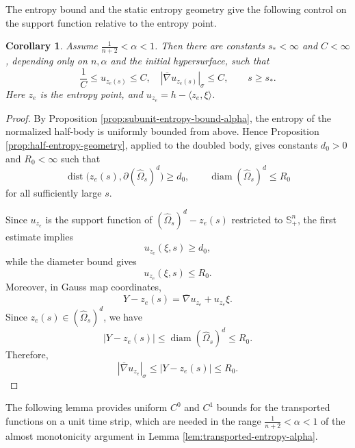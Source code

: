\documentclass[11pt, reqno]{amsart}
\newtheorem{corollary}[theorem]{Corollary}
\theoremstyle{remark}
\theoremstyle{definition}
\numberwithin{equation}{section}
\DeclareMathOperator{\diam}{diam}
\DeclareMathOperator{\dist}{dist}
\begin{document}
The entropy bound and the static entropy geometry give the following control on the support function relative to the entropy point.

\begin{corollary}
	\label{cor-bounded}
	Assume $\frac{1}{n+2} < \alpha <1$.  Then there are constants $s_*<\infty$ and $C<\infty$, depending only on
	$n,\alpha$ and the initial hypersurface, such that
	\begin{equation*}
		\frac{1}{C} \leq u_{z_e(s)}\leq C , \quad |\overline{\nabla}u_{z_e(s)}|_{\sigma} \leq C,
		\qquad s\ge s_*.
	\end{equation*}
    Here $z_e$ is the entropy point, and $u_{z_e}=h-\langle z_e,\xi \rangle$.
\end{corollary}

\begin{proof}
By Proposition \ref{prop:subunit-entropy-bound-alpha}, the entropy of the normalized half-body is
uniformly bounded from above. Hence Proposition \ref{prop:half-entropy-geometry}, applied to
the doubled body, gives constants $d_0>0$ and $R_0<\infty$ such
that
\begin{equation*}
    \dist\bigl(z_e(s),\partial(\widehat\Omega_s)^d\bigr)
    \geq d_0,
    \qquad
    \diam(\widehat\Omega_s)^d\leq R_0
\end{equation*}
for all sufficiently large $s$.

Since $u_{z_e}$ is the support function of
$(\widehat\Omega_s)^d-z_e(s)$ restricted to
$\mathbb S^n_+$, the first estimate implies
\begin{equation*}
    u_{z_e}(\xi,s)\geq d_0,
\end{equation*}
while the diameter bound gives
\begin{equation*}
    u_{z_e}(\xi,s)\leq R_0.
\end{equation*}
Moreover, in Gauss map coordinates,
\begin{equation*}
    Y-z_e(s)
    =
    \overline{\nabla} u_{z_e}+u_{z_e}\xi.
\end{equation*}
Since $z_e(s)\in(\widehat\Omega_s)^d$, we have
\begin{equation*}
    |Y-z_e(s)|\leq\diam(\widehat\Omega_s)^d\leq R_0.
\end{equation*}
Therefore,
\begin{equation*}
    |\overline{\nabla} u_{z_e}|_\sigma
    \leq |Y-z_e(s)|
    \leq R_0.
\end{equation*}
\end{proof}

The following lemma provides uniform $C^0$ and $C^1$ bounds for the transported functions on a unit time strip, which are needed in the range $\frac{1}{n+2}<\alpha<1$ of the almost monotonicity argument in Lemma \ref{lem:transported-entropy-alpha}.
\end{document}
